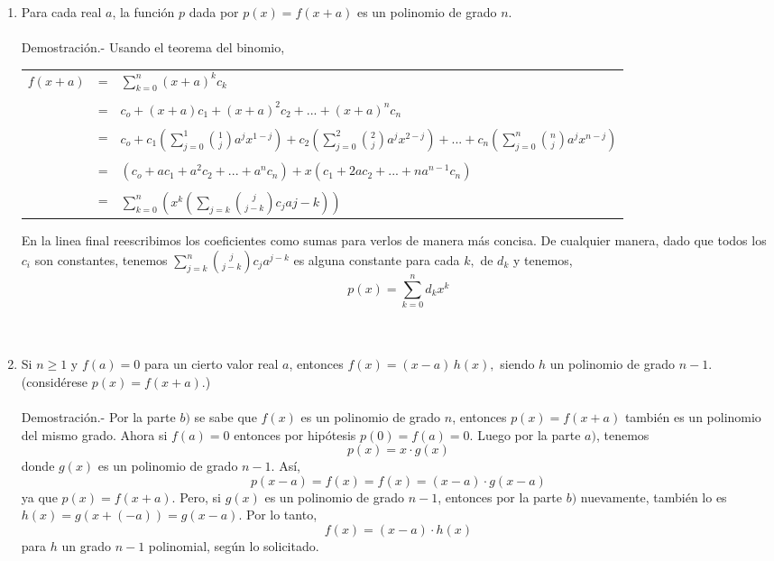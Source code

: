 \begin{teo}
\begin{enumerate}[\bfseries a)]
\item Para cada real $a$, la función $p$ dada por $p(x)=f(x+a)$ es un polinomio de grado $n.$\\\\
Demostración.- \; Usando el teorema del binomio,
\begin{center}
\begin{tabular}{r c l}
$f(x+a)$&=&$ \displaystyle\sum_{k=0}^{n} (x+a)^k c_k$\\\\
&=&$c_o + (x+a)c_1 + (x+a)^2 c_2 + ...+(x+a)^n c_n$\\\\
&=&$ c_o + c_1 \left( \displaystyle\sum_{j=0}^{1} {1 \choose j} a^j x^{1-j} \right) + c_2 \left( \displaystyle\sum_{j=0}^2 {2 \choose j} a^j x^{2-j} \right) 
+ ... + c_n \left( \displaystyle\sum_{j=0}^{n} {n \choose j} a^j x^{n-j} \right)$\\\\
&=&$(c_o + ac_1 + a^2 c_2 + ... + a^n c_n) + x(c_1 + 2ac_2 + ... + na^{n-1} c_n)$\\\\
&=&$\displaystyle\sum_{k=0}^n \left( x^k \left( \displaystyle\sum_{j=k} {j \choose j-k} c_j a{j-k}\right) \right)$\\
\end{tabular}
\end{center}
En la linea final reescribimos los coeficientes como sumas para verlos de manera más concisa. De cualquier manera, dado que todos los $c_i$ son constantes, tenemos $\displaystyle\sum_{j=k}^n {j \choose j-k} c_j a^{j-k}$ es alguna constante para cada $k,$ de $d_k$ y tenemos, $$p(x) = \displaystyle\sum_{k=0}^n d_k x^k$$\\\\

\item Si $n \geq 1$ \; y \; $f(a)=0$ para un cierto valor real $a$, entonces $f(x) = (x-a) \, h(x),$ siendo $h$ un polinomio de grado $n-1$. (considérese $p(x)=f(x+a).$)\\\\
Demostración.- \; Por la parte $b)$ se sabe que $f(x)$ es un polinomio de grado $n$, entonces $p(x)=f(x+a)$ también es un polinomio del mismo grado. Ahora si $f(a)=0$ entonces por hipótesis $p(0)=f(a)=0$. Luego por la parte $a)$, tenemos $$p(x)=x \cdot g(x)$$ donde $g(x)$ es un polinomio de grado $n-1$. Así,
$$p(x-a)=f(x)= f(x) = (x-a) \cdot g(x-a)$$ ya que $p(x)=f(x+a)$. Pero, si $g(x)$ es un polinomio de grado $n-1$, entonces por la parte $b)$ nuevamente, también lo es $h(x)=g(x+(-a)) = g(x-a)$. Por lo tanto, $$f(x)=(x-a) \cdot h(x)$$ para $h$ un grado $n-1$ polinomial, según lo solicitado.\\\\\


\end{enumerate}
\end{teo}
